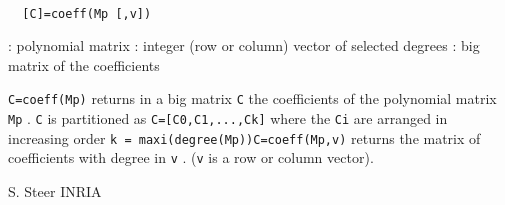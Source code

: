 
\begin{mandesc}
   \\ %
\end{mandesc}
\begin{calling_sequence}
\begin{verbatim}
  [C]=coeff(Mp [,v])  
\end{verbatim}
\end{calling_sequence}
\begin{parameters}
  \begin{varlist}
    : polynomial matrix
    : integer (row or column) vector of selected degrees
    : big matrix of the coefficients
  \end{varlist}
\end{parameters}
\begin{mandescription}
  \verb!C=coeff(Mp)!
  returns in a big matrix \verb!C! the coefficients of the
  polynomial matrix \verb!Mp! . \verb!C! is partitioned
  as \verb!C=[C0,C1,...,Ck]! 
  where the \verb!Ci! are arranged in increasing order 
  \verb!k = maxi(degree(Mp))!\verb!C=coeff(Mp,v)! returns the matrix of coefficients with 
  degree in \verb!v! . (\verb!v! is a row or column vector).
\end{mandescription}
\begin{manseealso}
      
\end{manseealso}
\begin{authors}
  S. Steer INRIA
\end{authors}
